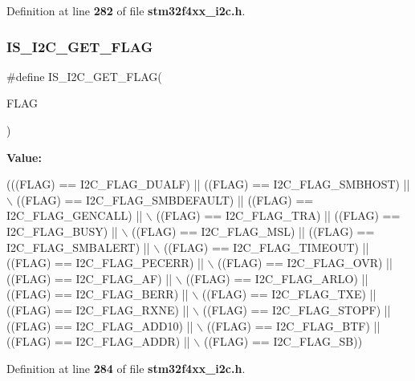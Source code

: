 Definition at line \textbf{ 282} of file \textbf{ stm32f4xx\+\_\+i2c.\+h}.

\mbox{\label{group__I2C__flags__definition_ga1a2c2a7c50cd8e33e532918106b4f6ce}} 
\subsubsection{I\+S\+\_\+\+I2\+C\+\_\+\+G\+E\+T\+\_\+\+F\+L\+AG}
{\footnotesize\ttfamily \#define I\+S\+\_\+\+I2\+C\+\_\+\+G\+E\+T\+\_\+\+F\+L\+AG(\begin{DoxyParamCaption}\item[{}]{F\+L\+AG }\end{DoxyParamCaption})}

{\bfseries Value\+:}
\begin{DoxyCode}
(((FLAG) == I2C_FLAG_DUALF) || ((FLAG) == I2C_FLAG_SMBHOST) || \(\backslash\)
                               ((FLAG) == I2C_FLAG_SMBDEFAULT) || ((FLAG) == 
      I2C_FLAG_GENCALL) || \(\backslash\)
                               ((FLAG) == I2C_FLAG_TRA) || ((FLAG) == 
      I2C_FLAG_BUSY) || \(\backslash\)
                               ((FLAG) == I2C_FLAG_MSL) || ((FLAG) == 
      I2C_FLAG_SMBALERT) || \(\backslash\)
                               ((FLAG) == I2C_FLAG_TIMEOUT) || ((FLAG) == 
      I2C_FLAG_PECERR) || \(\backslash\)
                               ((FLAG) == I2C_FLAG_OVR) || ((FLAG) == 
      I2C_FLAG_AF) || \(\backslash\)
                               ((FLAG) == I2C_FLAG_ARLO) || ((FLAG) == 
      I2C_FLAG_BERR) || \(\backslash\)
                               ((FLAG) == I2C_FLAG_TXE) || ((FLAG) == 
      I2C_FLAG_RXNE) || \(\backslash\)
                               ((FLAG) == I2C_FLAG_STOPF) || ((FLAG) == 
      I2C_FLAG_ADD10) || \(\backslash\)
                               ((FLAG) == I2C_FLAG_BTF) || ((FLAG) == 
      I2C_FLAG_ADDR) || \(\backslash\)
                               ((FLAG) == I2C_FLAG_SB))
\end{DoxyCode}


Definition at line \textbf{ 284} of file \textbf{ stm32f4xx\+\_\+i2c.\+h}.

